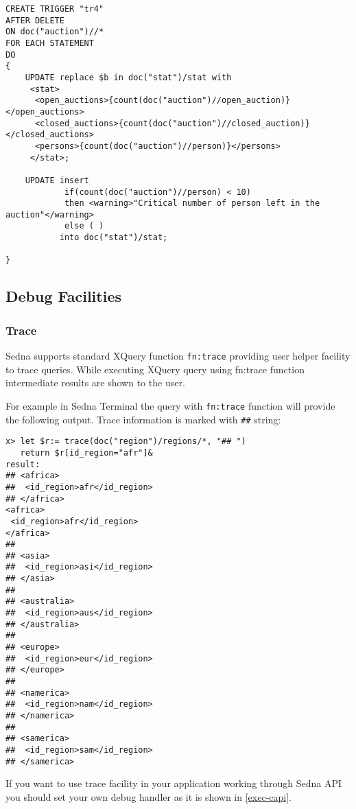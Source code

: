 \documentclass[a4paper,12pt]{article}
\begin{document}
\begin{verbatim}
CREATE TRIGGER "tr4"
AFTER DELETE
ON doc("auction")//*
FOR EACH STATEMENT
DO
{
	UPDATE replace $b in doc("stat")/stat with
	 <stat>
	  <open_auctions>{count(doc("auction")//open_auction)}</open_auctions>
	  <closed_auctions>{count(doc("auction")//closed_auction)}</closed_auctions>
	  <persons>{count(doc("auction")//person)}</persons>
	 </stat>;

	UPDATE insert
	        if(count(doc("auction")//person) < 10)
	        then <warning>"Critical number of person left in the auction"</warning>
	        else ( )
	       into doc("stat")/stat;

}
\end{verbatim}


\subsection{Debug Facilities}
\subsubsection{Trace}
\label{trace}
Sedna supports standard XQuery function \verb!fn:trace! \cite{paper:query-fo} providing user helper facility to trace queries. While executing XQuery query using fn:trace function intermediate results are shown to the user.

For example in Sedna Terminal the query with \verb!fn:trace! function will provide the following output. Trace information is marked with \verb!##! string:

\begin{verbatim}
x> let $r:= trace(doc("region")/regions/*, "## ")
   return $r[id_region="afr"]&
result:
## <africa>
##  <id_region>afr</id_region>
## </africa>
<africa>
 <id_region>afr</id_region>
</africa>
##
## <asia>
##  <id_region>asi</id_region>
## </asia>
##
## <australia>
##  <id_region>aus</id_region>
## </australia>
##
## <europe>
##  <id_region>eur</id_region>
## </europe>
##
## <namerica>
##  <id_region>nam</id_region>
## </namerica>
##
## <samerica>
##  <id_region>sam</id_region>
## </samerica>
\end{verbatim}

If you want to use trace facility in your application working through Sedna API you should set your own debug handler as it is shown in \ref{exec-capi}.
\end{document}
